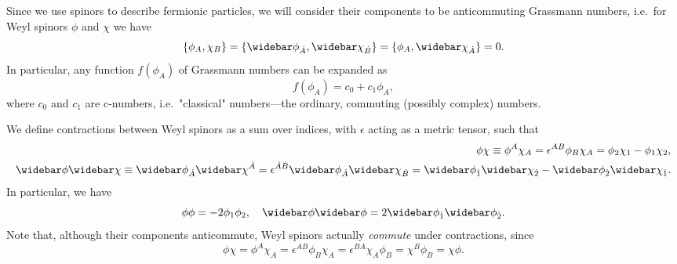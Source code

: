 Since we use spinors to describe fermionic particles, we will consider their components to be anticommuting Grassmann numbers, i.e.\ for Weyl spinors $\phi$ and $\chi$ we have
\begin{equation}
    \{ \phi_A,\chi_B \} = \{ \widebar\phi_{\dot{A}},\widebar\chi_{\dot{B}} \} = \{ \phi_A, \widebar\chi_{\dot{A}} \} = 0.
\end{equation}
In particular, any function $f(\phi_A)$ of Grassmann numbers can be expanded as
\begin{equation}
    f(\phi_A) = c_0 + c_1 \phi_A,
\end{equation}
where $c_0$ and $c_1$ are c-numbers, i.e.\ "classical" numbers---the ordinary, commuting (possibly complex) numbers.

We define contractions between Weyl spinors as a sum over indices, with $\epsilon$ acting as a metric tensor, such that
\begin{subequations}
\begin{align}
    \phi\chi \equiv \phi^A\chi_A
    = \epsilon^{AB} \phi_B\chi_A
    = \phi_2\chi_1 - \phi_1\chi_2,
    \\
    \widebar\phi\widebar\chi \equiv \widebar\phi_{\dot{A}}\widebar\chi^{\dot{A}}
    = \epsilon^{\dot{A}\dot{B}} \widebar\phi_{\dot{A}}\widebar\chi_{\dot{B}}
    = \widebar\phi_{\dot{1}}\widebar\chi_{\dot{2}} - \widebar\phi_{\dot{2}}\widebar\chi_{\dot{1}}.
\end{align}
\end{subequations}
In particular, we have
\begin{equation}
    \phi\phi = - 2\phi_1\phi_2, \quad \widebar\phi\widebar\phi = 2\widebar\phi_{\dot{1}}\widebar\phi_{\dot{2}}.
\end{equation}
Note that, although their components anticommute, Weyl spinors actually \emph{commute} under contractions, since
\begin{equation}
    \phi\chi = \phi^A\chi_A = \epsilon^{AB}\phi_B\chi_A = \epsilon^{BA}\chi_A\phi_B = \chi^B\phi_B = \chi\phi.
\end{equation}

